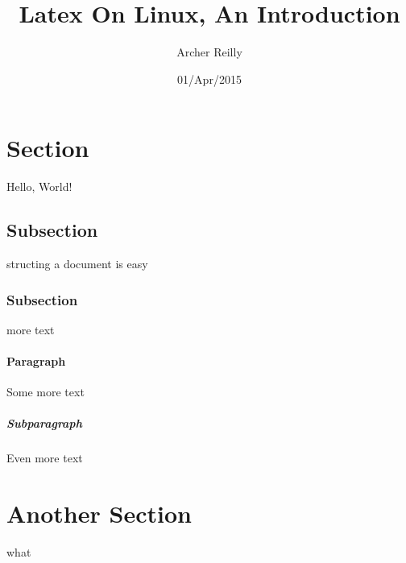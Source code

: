 \documentclass{article}
\title{Latex On Linux, An Introduction}
\date{01/Apr/2015}
\author{Archer Reilly}
\begin{document}
\maketitle
{}
\newpage
{}

\section{Section}
Hello, World!

\subsection{Subsection}
structing a document is easy

\subsubsection{Subsection}
more text

\paragraph{Paragraph}
Some more text

\subparagraph{Subparagraph}
Even more text

\section{Another Section}
what
\end{document}
